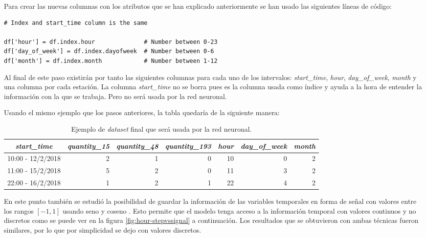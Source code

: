 \begin{enumerate}
    Para crear las nuevas columnas con los atributos que se han explicado anteriormente se han usado las siguientes líneas de código:
    \begin{verbatim}
# Index and start_time column is the same

df['hour'] = df.index.hour              # Number between 0-23
df['day_of_week'] = df.index.dayofweek  # Number between 0-6
df['month'] = df.index.month            # Number between 1-12
    \end{verbatim}
    
    Al final de este paso existirán por tanto las siguientes columnas para cada uno de los intervalos: \textit{start\_time}, \textit{hour}, \textit{day\_of\_week}, \textit{month} y una columna por cada estación. La columna \textit{start\_time} no se borra pues es la columna usada como índice y ayuda a la hora de entender la información con la que se trabaja. Pero no será usada por la red neuronal.
    \newline
    
    Usando el mismo ejemplo que los pasos anteriores, la tabla quedaría de la siguiente manera:
    \begin{table}[H]
    \footnotesize
    \centering
    \begin{tabular}{c|rrr|rrr}
        \toprule
        \textit{start\_time} & \textit{quantity\_15} & \textit{quantity\_48} & \textit{quantity\_193} & \textit{hour} & \textit{day\_of\_week} & \textit{month} \\
        \midrule
        10:00 - 12/2/2018 & 2 & 1 & 0 & 10 & 0 & 2 \\
        11:00 - 15/2/2018 & 5 & 2 & 0 & 11 & 3 & 2 \\
        22:00 - 16/2/2018 & 1 & 2 & 1 & 22 & 4 & 2 \\
        
        \bottomrule
    \end{tabular}
    \cprotect\caption{Ejemplo de \textit{dataset} final que será usada por la red neuronal.}
    \label{tab:intervals_example}
    \end{table}
    
    
    En este punto también se estudió la posibilidad de guardar la información de las variables temporales en forma de señal con valores entre los rangos $[-1, 1]$ usando seno y coseno \cite{reddit_time}. Esto permite que el modelo tenga acceso a la información temporal con valores continuos y no discretos como se puede ver en la figura \ref{fig:hour-stepvssignal} a continuación. Los resultados que se obtuvieron con ambas técnicas fueron similares, por lo que por simplicidad se dejo con valores discretos.
    

\end{enumerate}

